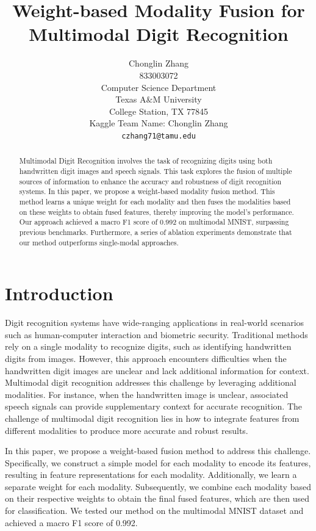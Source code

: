 \documentclass{article}
\title{Weight-based Modality Fusion for Multimodal Digit Recognition}
\author{%
  Chonglin Zhang\\
  833003072 \\
  Computer Science Department\\
  Texas A$\&$M University\\
  College Station, TX 77845 \\
  Kaggle Team Name: Chonglin Zhang \\
  \texttt{czhang71@tamu.edu} \\
}
\begin{document}
\maketitle


\begin{abstract}
  Multimodal Digit Recognition involves the task of recognizing digits using both handwritten digit images and speech signals. This task explores the fusion of multiple sources of information to enhance the accuracy and robustness of digit recognition systems. In this paper, we propose a weight-based modality fusion method. This method learns a unique weight for each modality and then fuses the modalities based on these weights to obtain fused features, thereby improving the model's performance. Our approach achieved a macro F1 score of 0.992 on multimodal MNIST, surpassing previous benchmarks. Furthermore, a series of ablation experiments demonstrate that our method outperforms single-modal approaches.
\end{abstract}


\section{Introduction}
Digit recognition systems have wide-ranging applications in real-world scenarios such as human-computer interaction and biometric security. Traditional methods rely on a single modality to recognize digits, such as identifying handwritten digits from images. However, this approach encounters difficulties when the handwritten digit images are unclear and lack additional information for context. Multimodal digit recognition addresses this challenge by leveraging additional modalities. For instance, when the handwritten image is unclear, associated speech signals can provide supplementary context for accurate recognition. The challenge of multimodal digit recognition lies in how to integrate features from different modalities to produce more accurate and robust results.

In this paper, we propose a weight-based fusion method to address this challenge. Specifically, we construct a simple model for each modality to encode its features, resulting in feature representations for each modality. Additionally, we learn a separate weight for each modality. Subsequently, we combine each modality based on their respective weights to obtain the final fused features, which are then used for classification. We tested our method on the multimodal MNIST dataset and achieved a macro F1 score of 0.992.
\end{document}
